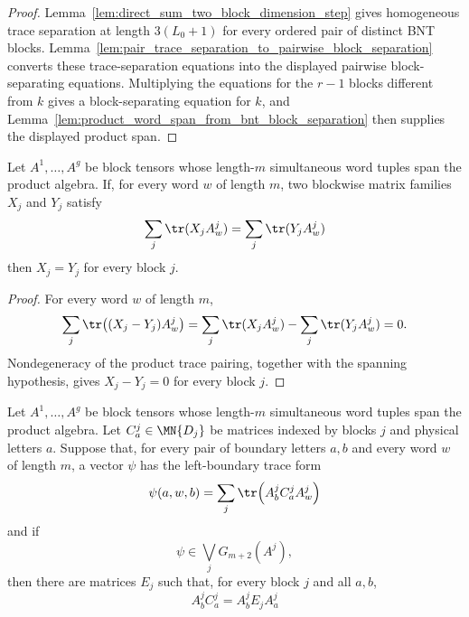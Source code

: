 \begin{proof}
    \leanok
    Lemma~\ref{lem:direct_sum_two_block_dimension_step} gives homogeneous
    trace separation at length $3(L_0+1)$ for every ordered pair of distinct
    BNT blocks. Lemma~\ref{lem:pair_trace_separation_to_pairwise_block_separation}
    converts these trace-separation equations into the displayed pairwise
    block-separating equations. Multiplying the equations for the $r-1$
    blocks different from $k$ gives a block-separating equation for $k$, and
    Lemma~\ref{lem:product_word_span_from_bnt_block_separation} then supplies the
    displayed product span.
\end{proof}

\begin{lemma}
    \label{lem:block_matrices_equal_from_trace_pairings}
    \leanok
    Let $A^1,\ldots,A^g$ be block tensors whose length-$m$ simultaneous word
    tuples span the product algebra. If, for every word $w$ of length $m$,
    two blockwise matrix families $X_j$ and $Y_j$ satisfy
    \[
        \sum_j\tr(X_jA^j_w)
        =
        \sum_j\tr(Y_jA^j_w)
    \]
    then $X_j=Y_j$ for every block $j$.
\end{lemma}

\begin{proof}
    \leanok
    For every word $w$ of length $m$,
    \[
        \sum_j\tr\!\left((X_j-Y_j)A^j_w\right)
        =
        \sum_j\tr(X_jA^j_w)
        -
        \sum_j\tr(Y_jA^j_w)
        =
        0.
    \]
    Nondegeneracy of the product trace pairing, together with the spanning
    hypothesis, gives $X_j-Y_j=0$ for every block $j$.
\end{proof}

\begin{lemma}
    \label{lem:blockwise_boundary_identities_from_left_trace_membership}
    \leanok
    Let $A^1,\ldots,A^g$ be block tensors whose length-$m$ simultaneous word
    tuples span the product algebra. Let $C^j_a\in \MN{D_j}$ be
    matrices indexed by blocks $j$ and physical letters $a$. Suppose that,
    for every pair of boundary letters $a,b$ and every word $w$ of length
    $m$, a vector $\psi$ has the left-boundary trace form
    \[
        \psi(a,w,b)=
        \sum_j\tr\!\left(A^j_b C^j_a A^j_w\right)
    \]
    and if
    \[
        \psi\in\bigvee_j G_{m+2}(A^j),
    \]
    then there are matrices $E_j$ such that, for every block $j$ and all
    $a,b$,
    \[
        A^j_bC^j_a=A^j_bE_jA^j_a
    \]
\end{lemma}

